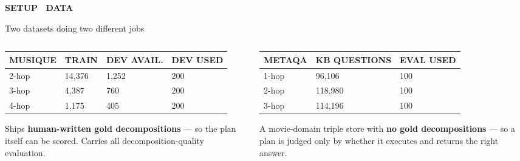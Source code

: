 \documentclass[aspectratio=169,11pt]{beamer}
\providecommand{\textls}[2][]{#2}
\newcommand{\lsp}[1]{\textls[140]{#1}}
\newcommand{\slidehead}[2]{%
  {\color{accent}\fontsize{6.8}{8}\selectfont\bfseries\lsp{#1}\par}%
  \vspace{2.4mm}%
  {\color{ink}\fontsize{15}{18}\selectfont #2\par}%
  \vspace{3.4mm}%
}
\newcommand{\colhead}[1]{{\color{accent}\fontsize{6.5}{8}\selectfont\bfseries\lsp{#1}}}
\begin{document}
\begin{frame}[t]
\slidehead{SETUP \textperiodcentered\ DATA}{Two datasets doing two different jobs}
\begin{columns}[T,onlytextwidth]
\begin{column}{0.47\textwidth}
\footnotesize
\begin{tabular}{@{}p{14mm}R{16mm}R{18mm}R{16mm}@{}}
\colhead{MUSIQUE} & \colhead{TRAIN} & \colhead{DEV AVAIL.} & \colhead{DEV USED}\\
-hop & \textcolor{inktwo}{14,376} & \textcolor{inktwo}{1,252} & \textcolor{inktwo}{200}\\
3-hop & \textcolor{inktwo}{4,387} & \textcolor{inktwo}{760} & \textcolor{inktwo}{200}\\
4-hop & \textcolor{inktwo}{1,175} & \textcolor{inktwo}{405} & \textcolor{inktwo}{200}\\
\bottomrule
\end{tabular}
\par\vspace{3.5mm}
{\color{inktwo}\scriptsize
 Ships \textbf{human-written gold decompositions} --- so the plan itself can be scored.
 Carries all decomposition-quality evaluation.\par}
\end{column}
\begin{column}{0.47\textwidth}
\footnotesize
\begin{tabular}{@{}p{16mm}R{20mm}R{18mm}@{}}
\colhead{METAQA} & \colhead{KB QUESTIONS} & \colhead{EVAL USED}\\
-hop & \textcolor{inktwo}{96,106} & \textcolor{inktwo}{100}\\
2-hop & \textcolor{inktwo}{118,980} & \textcolor{inktwo}{100}\\
3-hop & \textcolor{inktwo}{114,196} & \textcolor{inktwo}{100}\\
\bottomrule
\end{tabular}
\par\vspace{3.5mm}
{\color{inktwo}\scriptsize
 A movie-domain triple store with \textbf{no gold decompositions} --- so a plan is judged
 only by whether it executes and returns the right answer.\par}
\end{column}
\end{columns}
\end{frame}
\end{document}
